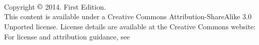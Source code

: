 \chapter*{}
\vfill

\

\noindent Copyright $\copyright$ 2014. First Edition. \\

\noindent This content is available under a Creative Commons Attribution-ShareAlike 3.0 Unported license. License details are available at the Creative Commons website:  \\

\noindent For license and attribution guidance, see 
